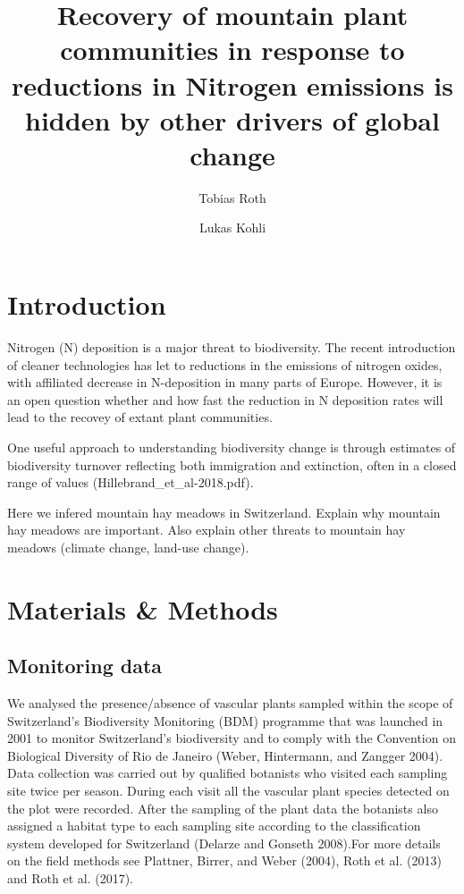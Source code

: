 \documentclass[fleqn,10pt,lineno]{wlpeerj} %
\title{Recovery of mountain plant communities in response to reductions in
Nitrogen emissions is hidden by other drivers of global change}
\author[1, 2]{Tobias Roth}
\author[2]{Lukas Kohli}
\affil[1]{Zoological Institute, University of Basel, Basel, Switzerland}
\affil[2]{Hintermann Weber AG, Austrasse 2a, 4153 Reinach, Switzerland}
\theoremstyle{definition}
\theoremstyle{definition}
\theoremstyle{definition}
\theoremstyle{remark}
\begin{document}
\flushbottom
\maketitle
\thispagestyle{empty}

\section*{Introduction}\label{introduction}

Nitrogen (N) deposition is a major threat to biodiversity. The recent
introduction of cleaner technologies has let to reductions in the
emissions of nitrogen oxides, with affiliated decrease in N-deposition
in many parts of Europe. However, it is an open question whether and how
fast the reduction in N deposition rates will lead to the recovey of
extant plant communities.

One useful approach to understanding biodiversity change is through
estimates of biodiversity turnover reflecting both immigration and
extinction, often in a closed range of values
(Hillebrand\_et\_al-2018.pdf).

Here we infered mountain hay meadows in Switzerland. Explain why
mountain hay meadows are important. Also explain other threats to
mountain hay meadows (climate change, land-use change).

\section*{Materials \& Methods}\label{materials-methods}

\subsection*{Monitoring data}\label{monitoring-data}

We analysed the presence/absence of vascular plants sampled within the
scope of Switzerland's Biodiversity Monitoring (BDM) programme that was
launched in 2001 to monitor Switzerland's biodiversity and to comply
with the Convention on Biological Diversity of Rio de Janeiro (Weber,
Hintermann, and Zangger 2004). Data collection was carried out by
qualified botanists who visited each sampling site twice per season.
During each visit all the vascular plant species detected on the plot
were recorded. After the sampling of the plant data the botanists also
assigned a habitat type to each sampling site according to the
classification system developed for Switzerland (Delarze and Gonseth
2008).For more details on the field methods see Plattner, Birrer, and
Weber (2004), Roth et al. (2013) and Roth et al. (2017).
\end{document}
